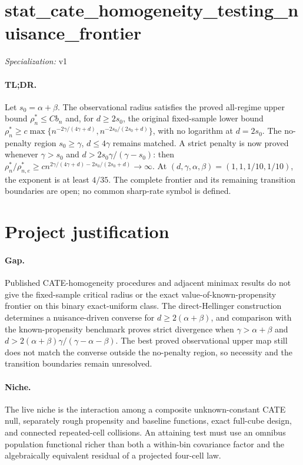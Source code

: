 \documentclass{article}
\begin{document}
\sloppy

\section*{stat\_\allowbreak{}cate\_\allowbreak{}homogeneity\_\allowbreak{}testing\_\allowbreak{}nuisance\_\allowbreak{}frontier}

\noindent\textit{Specialization:} v1\par

\paragraph{TL;DR.} Let \(s_0=\alpha+\beta\).  The observational radius satisfies the proved all-regime upper bound \(\rho_n^*\le Cb_n\) and, for \(d\ge2s_0\), the original fixed-sample lower bound \(\rho_n^*\ge c\max\{n^{-2\gamma/(4\gamma+d)},n^{-2s_0/(2s_0+d)}\}\), with no logarithm at \(d=2s_0\).  The no-penalty region \(s_0\ge\gamma\), \(d\le4\gamma\) remains matched.  A strict penalty is now proved whenever \(\gamma>s_0\) and \(d>2s_0\gamma/(\gamma-s_0)\): then \(\rho_n^*/\rho_{n,e}^*\ge c n^{2\gamma/(4\gamma+d)-2s_0/(2s_0+d)}\to\infty\).  At \((d,\gamma,\alpha,\beta)=(1,1,1/10,1/10)\), the exponent is at least \(4/35\).  The complete frontier and its remaining transition boundaries are open; no common sharp-rate symbol is defined.

\section{Project justification}

\paragraph{Gap.} Published CATE-homogeneity procedures and adjacent minimax results do not give the fixed-sample critical radius or the exact value-of-known-propensity frontier on this binary exact-uniform class.  The direct-Hellinger construction determines a nuisance-driven converse for \(d\ge2(\alpha+\beta)\), and comparison with the known-propensity benchmark proves strict divergence when \(\gamma>\alpha+\beta\) and \(d>2(\alpha+\beta)\gamma/(\gamma-\alpha-\beta)\).  The best proved observational upper map still does not match the converse outside the no-penalty region, so necessity and the transition boundaries remain unresolved.

\paragraph{Niche.} The live niche is the interaction among a composite unknown-constant CATE null, separately rough propensity and baseline functions, exact full-cube design, and connected repeated-cell collisions.  An attaining test must use an omnibus population functional richer than both a within-bin covariance factor and the algebraically equivalent residual of a projected four-cell law.
\end{document}
